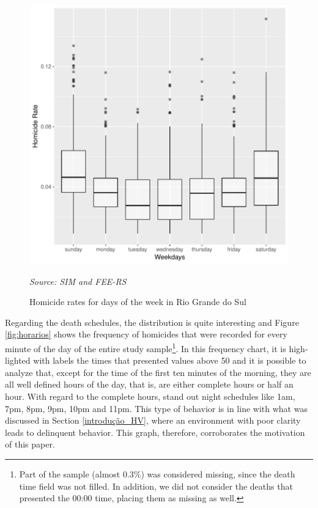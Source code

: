 \documentclass[12pt,openright,oneside,a4paper,english,french,spanish]{abntex2}
\numberwithin{table}{section} %
\numberwithin{figure}{section} %
\newcommand{\source}[1]{\textit{#1}}
\begin{document}
\begin{otherlanguage}{english}
\begin{figure}[H]
\begin{center}
\includegraphics{TESE_DE_DOUTORADO_RENAN_FINAL-plot3_HV}
\end{center}
\caption{Homicide rates for days of the week in Rio Grande do Sul}
\source{Source: SIM and FEE-RS}
\label{fig:dias_semana}
\end{figure}


Regarding the death schedules, the distribution is quite interesting and Figure \ref{fig:horarios} shows the frequency of homicides that were recorded for every minute of the day of the entire study sample\footnote{Part of the sample (almost 0.3\%) was considered missing, since the death time field was not filled. In addition, we did not consider the deaths that presented the 00:00 time, placing them as missing as well.}. In this frequency chart,  it is highlighted with labels the times that presented values above 50 and it is possible to analyze that, except for the time of the first ten minutes of the morning, they are all well defined hours of the day, that is, are either complete hours or half an hour. With regard to the complete hours, stand out night schedules like 1am, 7pm, 8pm, 9pm, 10pm and 11pm. This type of behavior is in line with what was discussed in Section \ref{introdução_HV}, where an environment with poor clarity leads to delinquent behavior. This graph, therefore, corroborates the motivation of this paper.


\end{otherlanguage}
\end{document}
